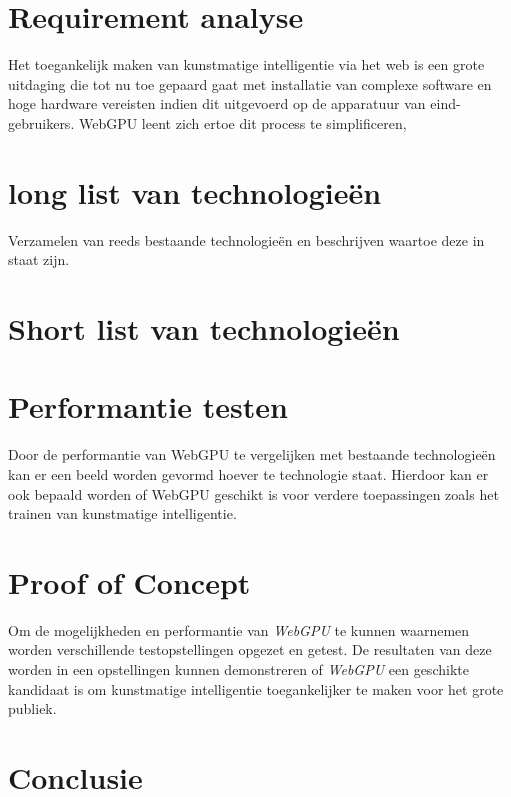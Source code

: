 \section{Requirement analyse}

Het toegankelijk maken van kunstmatige intelligentie via het web is een grote uitdaging die tot nu toe gepaard gaat met installatie van complexe software en hoge hardware vereisten indien dit uitgevoerd op de apparatuur van eind-gebruikers. WebGPU leent zich ertoe dit process te simplificeren, 

\section{long list van technologieën}

Verzamelen van reeds bestaande technologieën en beschrijven waartoe deze in staat zijn.

\section{Short list van technologieën}



\section{Performantie testen}

Door de performantie van WebGPU te vergelijken met bestaande technologieën kan er een beeld worden gevormd hoever te technologie staat. Hierdoor kan er ook bepaald worden of WebGPU geschikt is voor verdere toepassingen zoals het trainen van kunstmatige intelligentie.

\section{Proof of Concept}

Om de mogelijkheden en performantie van \textit{WebGPU} te kunnen waarnemen worden verschillende testopstellingen opgezet en getest. De resultaten van deze worden in een opstellingen kunnen demonstreren of \textit{WebGPU} een geschikte kandidaat is om kunstmatige intelligentie toegankelijker te maken voor het grote publiek.

\section{Conclusie}


